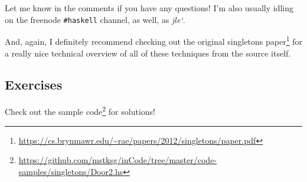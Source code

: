 \documentclass[]{article}
\renewcommand{\href}[2]{#2\footnote{\url{#1}}}
\begin{document}
Let me know in the comments if you have any questions! I'm also usually idling
on the freenode \texttt{\#haskell} channel, as well, as \emph{jle`}.

And, again, I definitely recommend checking out the
\href{https://cs.brynmawr.edu/~rae/papers/2012/singletons/paper.pdf}{original
singletons paper} for a really nice technical overview of all of these
techniques from the source itself.

\hypertarget{exercises}{%
\subsection{Exercises}\label{exercises}}

Check out the
\href{https://github.com/mstksg/inCode/tree/master/code-samples/singletons/Door2.hs}{sample
code} for solutions!
\end{document}
